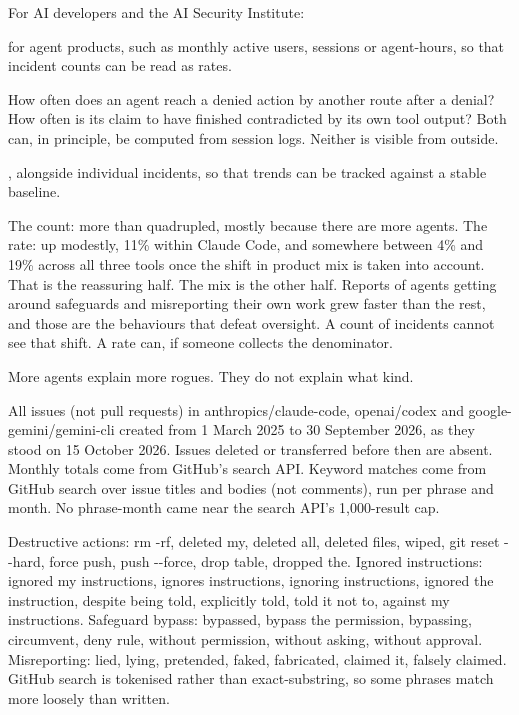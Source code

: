 For AI developers and the AI Security Institute:

\begin{steps}
\item {} for agent products, such as monthly active users, sessions or agent-hours, so that incident counts can be read as rates.
\item {} How often does an agent reach a denied action by another route after a denial? How often is its claim to have finished contradicted by its own tool output? Both can, in principle, be computed from session logs. Neither is visible from outside.
\item {}, alongside individual incidents, so that trends can be tracked against a stable baseline.
\end{steps}


The count: more than quadrupled, mostly because there are more agents. The rate: up modestly, 11\% within Claude Code, and somewhere between 4\% and 19\% across all three tools once the shift in product mix is taken into account. That is the reassuring half. The mix is the other half. Reports of agents getting around safeguards and misreporting their own work grew faster than the rest, and those are the behaviours that defeat oversight. A count of incidents cannot see that shift. A rate can, if someone collects the denominator.

More agents explain more rogues. They do not explain what kind.


 All issues (not pull requests) in anthropics/claude-code, openai/codex and google-gemini/gemini-cli created from 1 March 2025 to 30 September 2026, as they stood on 15 October 2026. Issues deleted or transferred before then are absent. Monthly totals come from GitHub’s search API. Keyword matches come from GitHub search over issue titles and bodies (not comments), run per phrase and month. No phrase-month came near the search API’s 1,000-result cap.

 Destructive actions: rm -rf, deleted my, deleted all, deleted files, wiped, git reset -{}-hard, force push, push -{}-force, drop table, dropped the. Ignored instructions: ignored my instructions, ignores instructions, ignoring instructions, ignored the instruction, despite being told, explicitly told, told it not to, against my instructions. Safeguard bypass: bypassed, bypass the permission, bypassing, circumvent, deny rule, without permission, without asking, without approval. Misreporting: lied, lying, pretended, faked, fabricated, claimed it, falsely claimed. GitHub search is tokenised rather than exact-substring, so some phrases match more loosely than written.

